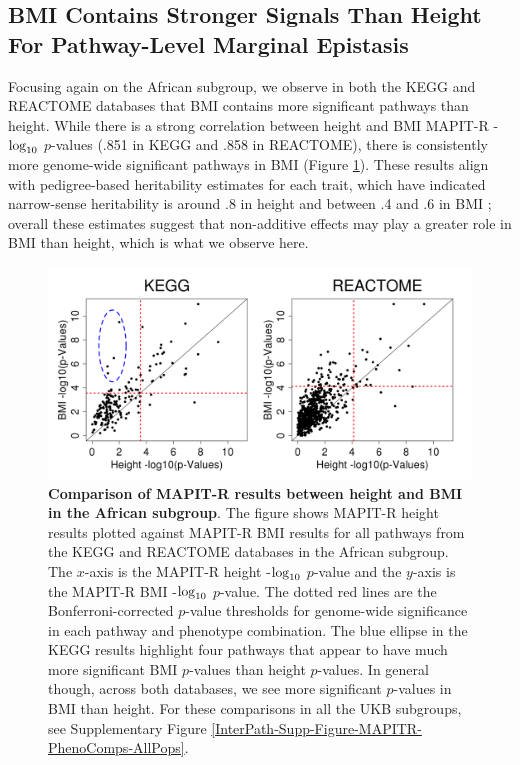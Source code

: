 \documentclass[12pt,a4paper]{article}
\def\log{{\rm log}}
\begin{document}
\subsection{BMI Contains Stronger Signals Than Height For Pathway-Level Marginal Epistasis}

Focusing again on the African subgroup, we observe in both the KEGG and REACTOME databases that BMI contains more significant pathways than height. While there is a strong correlation between height and BMI MAPIT-R -$\log_{10}$ $p$-values (.851 in KEGG and .858 in REACTOME), there is consistently more genome-wide significant pathways in BMI (Figure \ref{InterPath-Main-Figure-MAPITR-PhenoComps-African}). These results align with pedigree-based heritability estimates for each trait, which have indicated narrow-sense heritability is around .8 in height and between .4 and .6 in BMI \citep{Elks2012,Visscher2012}; overall these estimates suggest that non-additive effects may play a greater role in BMI than height, which is what we observe here. 

\begin{figure}[htb]
\centering
\includegraphics[scale=.45]{Images/Main/InterPath_Main_Figure_MAPITR_PhenoComps_African_vs3.png}
\caption[TBD]{\textbf{Comparison of MAPIT-R results between height and BMI in the African subgroup}. The figure shows MAPIT-R height results plotted against MAPIT-R BMI results for all pathways from the KEGG and REACTOME databases in the African subgroup. The $x$-axis is the MAPIT-R height -$\log_{10}$ $p$-value and the $y$-axis is the MAPIT-R BMI -$\log_{10}$ $p$-value. The dotted red lines are the Bonferroni-corrected $p$-value thresholds for genome-wide significance in each pathway and phenotype combination. The blue ellipse in the KEGG results highlight four pathways that appear to have much more significant BMI $p$-values than height $p$-values. In general though, across both databases, we see more significant $p$-values in BMI than height. For these comparisons in all the UKB subgroups, see Supplementary Figure \ref{InterPath-Supp-Figure-MAPITR-PhenoComps-AllPops}.}
\label{InterPath-Main-Figure-MAPITR-PhenoComps-African}
\end{figure}
\end{document}
